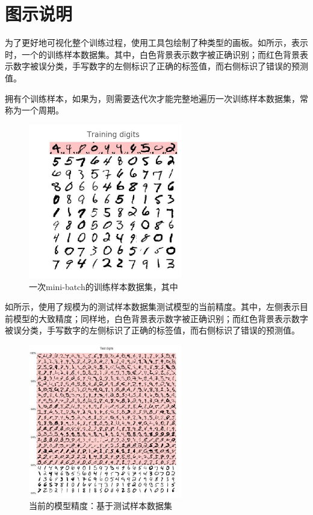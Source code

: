 \section{图示说明}

\begin{content}

为了更好地可视化整个训练过程，使用工具包绘制了种类型的画板。如所示，表示时，一个的训练样本数据集。其中，白色背景表示数字被正确识别；而红色背景表示数字被误分类，手写数字的左侧标识了正确的标签值，而右侧标识了错误的预测值。

拥有个训练样本，如果为，则需要迭代次才能完整地遍历一次训练样本数据集，常称为一个周期。

\begin{figure}[H]
\centering
\includegraphics[width=0.6\textwidth]{figures/mnist-training-digits.jpeg}
\caption{一次mini-batch的训练样本数据集，其中}
 \label{fig:mnist-training-digits}
\end{figure}

如所示，使用了规模为的测试样本数据集测试模型的当前精度。其中，左侧表示目前模型的大致精度；同样地，白色背景表示数字被正确识别；而红色背景表示数字被误分类，手写数字的左侧标识了正确的标签值，而右侧标识了错误的预测值。

\begin{figure}[H]
\centering
\includegraphics[width=0.6\textwidth]{figures/mnist-test-digits.jpeg}
\caption{当前的模型精度：基于测试样本数据集}
 \label{fig:mnist-test-digits}
\end{figure}


\end{content}
